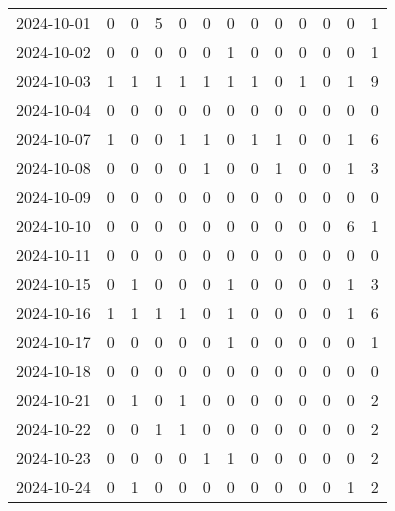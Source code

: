 \documentclass[dvipdfmx,oneside]{article}
\begin{document}
\begin{longtable}{lcccccccccccc}
        2024-10-01 &     0 &     0 &     5 &     0 &     0 &     0 &     0 &     0 &     0 &     0 &     0 &      1 \\
        2024-10-02 &     0 &     0 &     0 &     0 &     0 &     1 &     0 &     0 &     0 &     0 &     0 &      1 \\
        2024-10-03 &     1 &     1 &     1 &     1 &     1 &     1 &     1 &     0 &     1 &     0 &     1 &      9 \\
        2024-10-04 &     0 &     0 &     0 &     0 &     0 &     0 &     0 &     0 &     0 &     0 &     0 &      0 \\
        2024-10-07 &     1 &     0 &     0 &     1 &     1 &     0 &     1 &     1 &     0 &     0 &     1 &      6 \\
        2024-10-08 &     0 &     0 &     0 &     0 &     1 &     0 &     0 &     1 &     0 &     0 &     1 &      3 \\
        2024-10-09 &     0 &     0 &     0 &     0 &     0 &     0 &     0 &     0 &     0 &     0 &     0 &      0 \\
        2024-10-10 &     0 &     0 &     0 &     0 &     0 &     0 &     0 &     0 &     0 &     0 &     6 &      1 \\
        2024-10-11 &     0 &     0 &     0 &     0 &     0 &     0 &     0 &     0 &     0 &     0 &     0 &      0 \\
        2024-10-15 &     0 &     1 &     0 &     0 &     0 &     1 &     0 &     0 &     0 &     0 &     1 &      3 \\
        2024-10-16 &     1 &     1 &     1 &     1 &     0 &     1 &     0 &     0 &     0 &     0 &     1 &      6 \\
        2024-10-17 &     0 &     0 &     0 &     0 &     0 &     1 &     0 &     0 &     0 &     0 &     0 &      1 \\
        2024-10-18 &     0 &     0 &     0 &     0 &     0 &     0 &     0 &     0 &     0 &     0 &     0 &      0 \\
        2024-10-21 &     0 &     1 &     0 &     1 &     0 &     0 &     0 &     0 &     0 &     0 &     0 &      2 \\
        2024-10-22 &     0 &     0 &     1 &     1 &     0 &     0 &     0 &     0 &     0 &     0 &     0 &      2 \\
        2024-10-23 &     0 &     0 &     0 &     0 &     1 &     1 &     0 &     0 &     0 &     0 &     0 &      2 \\
        2024-10-24 &     0 &     1 &     0 &     0 &     0 &     0 &     0 &     0 &     0 &     0 &     1 &      2 \\

\end{longtable}
\end{document}
